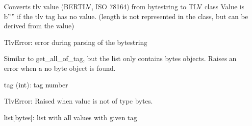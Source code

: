 \documentclass[letterpaper,10pt,english]{sphinxmanual}
\begin{document}
\begin{fulllineitems}
\begin{fulllineitems}
\label{\detokenize{aliro_actuator.access_protocol.tlv:aliro_actuator.access_protocol.tlv.TLV.from_bytes}}
\pysigstartsignatures
{}
\pysigstopsignatures
\sphinxAtStartPar
Converts tlv value (BER\sphinxhyphen{}TLV, ISO 7816\sphinxhyphen{}4) from bytestring to TLV class
Value is b”” if the tlv tag has no value.
(length is not represented in the class, but can be derived from the value)
\begin{description}
\sphinxAtStartPar
TlvError: error during parsing of the bytestring

\end{description}

\end{fulllineitems}


\begin{fulllineitems}
\label{\detokenize{aliro_actuator.access_protocol.tlv:aliro_actuator.access_protocol.tlv.TLV.get_all_bytes_of_tag}}
\pysigstartsignatures
{}
\pysigstopsignatures
\sphinxAtStartPar
Similar to get\_all\_of\_tag, but the list only contains bytes objects.
Raises an error when a no byte object is found.
\begin{description}
\sphinxAtStartPar
tag (int): tag number

\sphinxAtStartPar
TlvError: Raised when value is not of type bytes.

\sphinxAtStartPar
list{[}bytes{]}: list with all values with given tag

\end{description}

\end{fulllineitems}


\end{fulllineitems}
\end{document}
